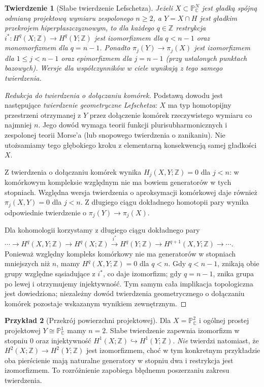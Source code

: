 \documentclass[11pt,a4paper,oneside]{report}
\newcommand{\C}{\mathbb{C}}
\newcommand{\Z}{\mathbb{Z}}
\theoremstyle{plain}
\newtheorem{twierdzenie}{Twierdzenie}[section]
\theoremstyle{definition}
\newtheorem{przyklad}[twierdzenie]{Przykład}
\theoremstyle{remark}
\begin{document}
\begin{twierdzenie}[Słabe twierdzenie Lefschetza]
\label{thm:xvii-weak-lefschetz}
Jeżeli $X\subset\mathbb P^N_\C$ jest gładką spójną odmianą
projektową wymiaru zespolonego $n\ge2$, a $Y=X\cap H$ jest gładkim
przekrojem hiperpłaszczyznowym, to dla każdego $q\in\Z$
restrykcja
$i^*:H^q(X;\Z)\to H^q(Y;\Z)$ jest izomorfizmem dla
$q<n-1$ oraz monomorfizmem dla $q=n-1$.
Ponadto $\pi_j(Y)\to\pi_j(X)$ jest izomorfizmem dla
$1\le j<n-1$ oraz epimorfizmem dla $j=n-1$ (przy ustalonych
punktach bazowych). Wersje dla współczynników w ciele
wynikają z tego samego twierdzenia.
\end{twierdzenie}
\begin{proof}[Redukcja do twierdzenia o dołączaniu komórek]
Podstawą dowodu jest następujące \emph{twierdzenie geometryczne
Lefschetza}: $X$ ma typ homotopijny przestrzeni otrzymanej z $Y$
przez dołączenie komórek rzeczywistego wymiaru co najmniej $n$.
Jego dowód wymaga teorii funkcji plurisubharmonicznych i
zespolonej teorii Morse'a (lub snopowego twierdzenia o zanikaniu).
Nie utożsamiamy tego głębokiego kroku z elementarną konsekwencją
samej gładkości $X$.

Z twierdzenia o dołączaniu komórek wynika
$H_j(X,Y;\Z)=0$ dla $j<n$: w komórkowym kompleksie
względnym nie ma bowiem generatorów w tych stopniach.
Względna wersja twierdzenia o aproksymacji komórkowej daje
również $\pi_j(X,Y)=0$ dla $j<n$.
Z długiego ciągu dokładnego homotopii pary wynika odpowiednie
twierdzenie o $\pi_j(Y)\to\pi_j(X)$.

Dla kohomologii korzystamy z długiego ciągu dokładnego pary
$\cdots\to H^q(X,Y;\Z)\to H^q(X;\Z)
\xrightarrow{i^*}H^q(Y;\Z)\to H^{q+1}(X,Y;\Z)\to\cdots$.
Ponieważ względny kompleks komórkowy nie ma generatorów
w stopniach mniejszych niż $n$, mamy
$H^q(X,Y;\Z)=0$ dla $q<n$. Gdy $q<n-1$, znikają
obie grupy względne sąsiadujące z $i^*$, co daje izomorfizm;
gdy $q=n-1$, znika grupa po lewej i otrzymujemy injektywność.
Tym samym cała implikacja topologiczna jest dowiedziona;
niezależny dowód twierdzenia geometrycznego o dołączaniu
komórek pozostaje wskazanym wynikiem zewnętrznym.
\end{proof}

\begin{przyklad}[Przekrój powierzchni projektowej]
Dla $X=\mathbb P^2_\C$ i ogólnej prostej projektowej
$Y\cong\mathbb P^1_\C$ mamy $n=2$.
Słabe twierdzenie zapewnia izomorfizm w stopniu $0$ oraz
injektywność $H^1(X;\Z)\hookrightarrow H^1(Y;\Z)$.
\emph{Nie} twierdzi natomiast, że $H^2(X;\Z)\to H^2(Y;\Z)$
jest izomorfizmem, choć w tym konkretnym przykładzie oba
pierścienie mają naturalne generatory w stopniu dwa i restrykcja
jest izomorfizmem. To rozróżnienie zapobiega błędnemu
poszerzaniu zakresu twierdzenia.
\end{przyklad}
\end{document}
